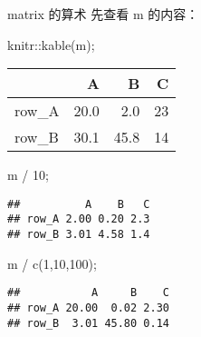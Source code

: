 \documentclass[ignorenonframetext,]{beamer}
\newenvironment{Shaded}{\begin{snugshade}}{\end{snugshade}}
\newcommand{\DecValTok}[1]{\textcolor[rgb]{0.00,0.00,0.81}{#1}}
\newcommand{\FunctionTok}[1]{\textcolor[rgb]{0.00,0.00,0.00}{#1}}
\newcommand{\NormalTok}[1]{#1}
\newcommand{\SpecialCharTok}[1]{\textcolor[rgb]{0.00,0.00,0.00}{#1}}
\newcommand\FontSmall{\fontsize{7}{8}\selectfont}
\begin{document}
\begin{frame}[fragile]{matrix 的算术}
\protect\hypertarget{matrix-ux7684ux7b97ux672f}{}
先查看 m 的内容：

\FontSmall

\begin{Shaded}
\begin{Highlighting}[]
\NormalTok{knitr}\SpecialCharTok{::}\FunctionTok{kable}\NormalTok{(m);}
\end{Highlighting}
\end{Shaded}

\begin{longtable}[]{@{}lrrr@{}}
\toprule()
& A & B & C \\
\midrule()
\endhead
row\_A & 20.0 & 2.0 & 23 \\
row\_B & 30.1 & 45.8 & 14 \\
\bottomrule()
\end{longtable}

\begin{Shaded}
\begin{Highlighting}[]
\NormalTok{m }\SpecialCharTok{/} \DecValTok{10}\NormalTok{;}
\end{Highlighting}
\end{Shaded}

\begin{verbatim}
##          A    B   C
## row_A 2.00 0.20 2.3
## row_B 3.01 4.58 1.4
\end{verbatim}

\begin{Shaded}
\begin{Highlighting}[]
\NormalTok{m }\SpecialCharTok{/}  \FunctionTok{c}\NormalTok{(}\DecValTok{1}\NormalTok{,}\DecValTok{10}\NormalTok{,}\DecValTok{100}\NormalTok{);}
\end{Highlighting}
\end{Shaded}

\begin{verbatim}
##           A     B    C
## row_A 20.00  0.02 2.30
## row_B  3.01 45.80 0.14
\end{verbatim}
\end{frame}
\end{document}
